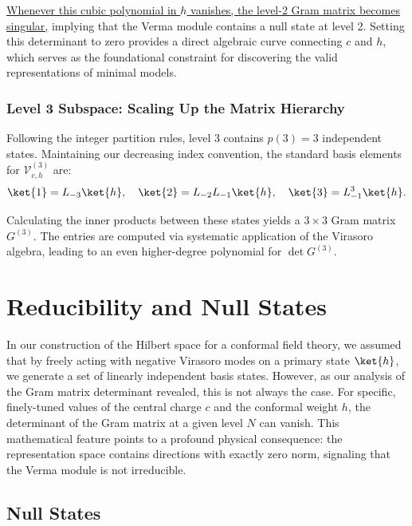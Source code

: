 \uline{Whenever this cubic polynomial in \(h\) vanishes, the level-2 Gram matrix becomes singular,} implying that the Verma module contains a null state at level 2. Setting this determinant to zero provides a direct algebraic curve connecting \(c\) and \(h\), which serves as the foundational constraint for discovering the valid representations of minimal models.

\subsubsection{Level 3 Subspace: Scaling Up the Matrix Hierarchy}

Following the integer partition rules, level 3 contains \(p(3) = 3\) independent states. Maintaining our decreasing index convention, the standard basis elements for \(\mathcal{V}_{c,h}^{(3)}\) are:
\[
    \ket{1} = L_{-3}\ket{h}, \quad \ket{2} = L_{-2}L_{-1}\ket{h}, \quad \ket{3} = L_{-1}^3\ket{h}.
\]

Calculating the inner products between these states yields a \(3 \times 3\) Gram matrix \(G^{(3)}\). The entries are computed via systematic application of the Virasoro algebra, leading to an even higher-degree polynomial for \(\det G^{(3)}\).


\section{Reducibility and Null States}

In our construction of the Hilbert space for a conformal field theory, we assumed that by freely acting with negative Virasoro modes on a primary state \(\ket{h}\), we generate a set of linearly independent basis states. However, as our analysis of the Gram matrix determinant revealed, this is not always the case. For specific, finely-tuned values of the central charge \(c\) and the conformal weight \(h\), the determinant of the Gram matrix at a given level \(N\) can vanish. This mathematical feature points to a profound physical consequence: the representation space contains directions with exactly zero norm, signaling that the Verma module is not irreducible.

\subsection{Null States}

